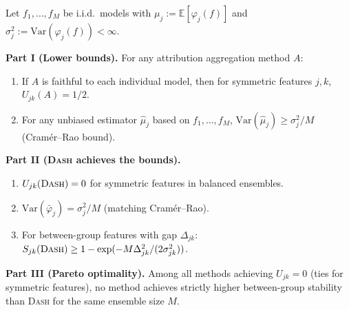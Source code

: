\documentclass{jmlr}
\newcommand{\E}{\mathbb{E}}
\newcommand{\Var}{\mathrm{Var}}
\newcommand{\DASH}{\textsc{Dash}}
\begin{document}
\begin{theorem}
\label{thm:dash-optimal}
Let $f_1, \ldots, f_M$ be i.i.d.\ models with $\mu_j := \E[\varphi_j(f)]$ and $\sigma_j^2 := \Var(\varphi_j(f)) < \infty$.

\textbf{Part I (Lower bounds).}
For any attribution aggregation method $A$:
\begin{enumerate}
    \item[(a)] If $A$ is faithful to each individual model, then for symmetric features $j, k$, $U_{jk}(A) = 1/2$.
    \item[(b)] For any unbiased estimator $\hat\mu_j$ based on $f_1, \ldots, f_M$, $\Var(\hat\mu_j) \geq \sigma_j^2 / M$ (Cram\'er--Rao bound).
\end{enumerate}

\textbf{Part II (\DASH{} achieves the bounds).}
\begin{enumerate}
    \item[(c)] $U_{jk}(\text{\DASH{}}) = 0$ for symmetric features in balanced ensembles.
    \item[(d)] $\Var(\bar\varphi_j) = \sigma_j^2 / M$ (matching Cram\'er--Rao).
    \item[(e)] For between-group features with gap $\Delta_{jk}$: $S_{jk}(\text{\DASH{}}) \geq 1 - \exp(-M\Delta_{jk}^2 / (2\sigma_{jk}^2))$.
\end{enumerate}

\textbf{Part III (Pareto optimality).}
Among all methods achieving $U_{jk} = 0$ (ties for symmetric features), no method achieves strictly higher between-group stability than \DASH{} for the same ensemble size $M$.
\end{theorem}
\end{document}
